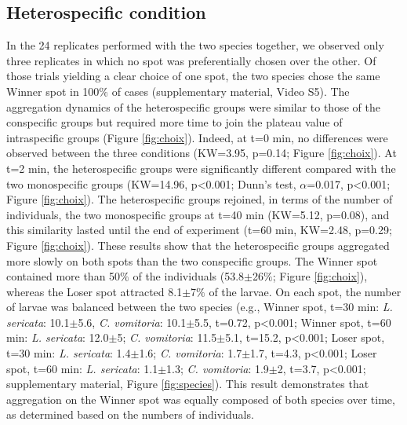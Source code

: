 		\subsection{Heterospecific condition}
In the 24 replicates performed with the two species together, we observed only three replicates in which no spot was preferentially chosen over the other. Of those trials yielding a clear choice of one spot, the two species chose the same Winner spot in 100$\%$ of cases (supplementary material, Video S5). The aggregation dynamics of the heterospecific groups were similar to those of the conspecific groups but required more time to join the plateau value of intraspecific groups (Figure \ref{fig:choix}). Indeed, at t=0 min, no differences were observed between the three conditions (KW=3.95, p=0.14; Figure \ref{fig:choix}). At t=2 min, the heterospecific groups were significantly different compared with the two monospecific groups (KW=14.96, p<0.001; Dunn’s test, $\alpha$=0.017, p<0.001; Figure \ref{fig:choix}). The heterospecific groups rejoined, in terms of the number of individuals, the two monospecific groups at t=40 min (KW=5.12, p=0.08), and this similarity lasted until the end of experiment (t=60 min, KW=2.48, p=0.29; Figure \ref{fig:choix}). These results show that the heterospecific groups aggregated more slowly on both spots than the two conspecific groups. The Winner spot contained more than 50$\%$ of the individuals (53.8$\pm$26$\%$; Figure \ref{fig:choix}), whereas the Loser spot attracted 8.1$\pm$7$\%$ of the larvae. On each spot, the number of larvae was balanced between the two species (e.g., Winner spot, t=30 min: \textit{L. sericata}: 10.1$\pm$5.6, \textit{C. vomitoria}: 10.1$\pm$5.5, t=0.72, p<0.001; Winner spot, t=60 min: \textit{L. sericata}: 12.0$\pm$5; \textit{C. vomitoria}: 11.5$\pm$5.1, t=15.2, p<0.001; Loser spot, t=30 min: \textit{L. sericata}: 1.4$\pm$1.6; \textit{C. vomitoria}: 1.7$\pm$1.7, t=4.3, p<0.001; Loser spot, t=60 min: \textit{L. sericata}: 1.1$\pm$1.3; \textit{C. vomitoria}: 1.9$\pm$2, t=3.7, p<0.001; supplementary material, Figure \ref{fig:species}). This result demonstrates that aggregation on the Winner spot was equally composed of both species over time, as determined based on the numbers of individuals.



